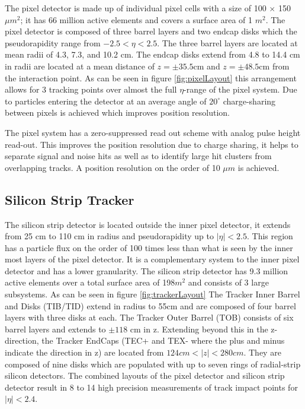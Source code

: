 The pixel detector is made up of individual pixel cells with a size of 
100 $\times$ 150 $\mu m^{2}$; it has 66 million active elements and covers
a surface area of 1 $m^{2}$. The pixel detector is composed of three barrel 
layers and two endcap disks which the pseudorapidity range from $-2.5<\eta<2.5$.
The three barrel layers are located at mean radii of 4.3, 7.3, and 10.2 cm. 
The endcap disks extend from 4.8 to 14.4 cm in radii are located at a mean distance
of $z=\pm35.5$cm and $z=\pm48.5$cm from the interaction point. 
As can be seen in figure \ref{fig:pixelLayout} this arrangement allows for 3 tracking points over 
almost the full $\eta$-range of the pixel system. Due to 
particles entering the detector at an average angle of $20^{\circ}$ 
charge-sharing between pixels is achieved which improves position resolution.

The pixel system has a zero-suppressed read out scheme with analog pulse
height read-out. This improves the position resolution due to charge sharing,
it helps to separate signal and noise hits as well as to identify large hit 
clusters from overlapping tracks.
A position resolution on the order of 10 $\mu m$ is achieved.

\subsection{Silicon Strip Tracker}
The silicon strip detector is located outside the inner pixel detector, 
it extends from 25 cm to 110 cm in radius and pseudorapidity up to $|\eta|<2.5$. 
This region has a particle flux on 
the order of 100 times less than what is seen by the inner most layers of 
the pixel detector. It is a complementary system to the inner pixel
detector and has a lower granularity. The silicon strip detector 
has 9.3 million active elements over a total surface area of 198$m^{2}$
and consists of 3 large subsystems. As can be seen in figure \ref{fig:trackerLayout}
The Tracker Inner Barrel and Disks (TIB/TID) extend in radius to
55cm and are composed of four barrel layers with three disks at each.
The Tracker Outer Barrel (TOB) consists of six barrel layers and extends to $\pm118$ cm
in z. Extending beyond this in the z-direction, the Tracker EndCaps (TEC+ and TEX- where the plus and minus
indicate the direction in z) are located from $124cm<|z|<280cm$. They are composed of 
nine disks which are populated with up to seven rings of radial-strip silicon detectors.
The combined layouts of the pixel detector and silicon strip detector
result in 8 to 14 high precision measurements of track impact points for 
$|\eta|<2.4$.